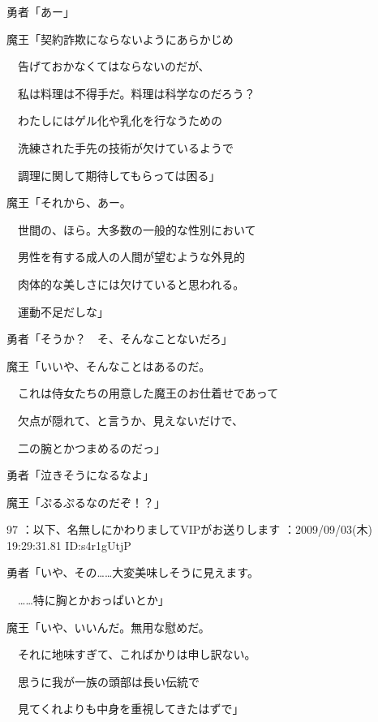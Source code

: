 \documentclass[a4j,twocolumn]{tarticle}
\begin{document}
勇者「あー」 



魔王「契約詐欺にならないようにあらかじめ\par{} 
　告げておかなくてはならないのだが、\par{} 
　私は料理は不得手だ。料理は科学なのだろう？\par{} 
　わたしにはゲル化や乳化を行なうための \par{}
　洗練された手先の技術が欠けているようで\par{} 
　調理に関して期待してもらっては困る」 



魔王「それから、あー。\par{} 
　世間の、ほら。大多数の一般的な性別において\par{} 
　男性を有する成人の人間が望むような外見的\par{} 
　肉体的な美しさには欠けていると思われる。\par{} 
　運動不足だしな」 



勇者「そうか？　そ、そんなことないだろ」 



魔王「いいや、そんなことはあるのだ。\par{} 
　これは侍女たちの用意した魔王のお仕着せであって\par{} 
　欠点が隠れて、と言うか、見えないだけで、\par{} 
　二の腕とかつまめるのだっ」 



勇者「泣きそうになるなよ」 



魔王「ぷるぷるなのだぞ！？」 

	
    
    

97 ：以下、名無しにかわりましてVIPがお送りします ：2009/09/03(木) 19:29:31.81 ID:s4r1gUtjP 


勇者「いや、その……大変美味しそうに見えます。\par{} 
　……特に胸とかおっぱいとか」 



魔王「いや、いいんだ。無用な慰めだ。\par{} 
　それに地味すぎて、こればかりは申し訳ない。\par{} 
　思うに我が一族の頭部は長い伝統で\par{} 
　見てくれよりも中身を重視してきたはずで」 
\end{document}
